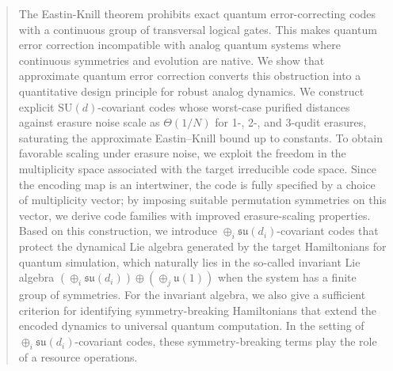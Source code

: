 \documentclass[twocolumn,superscriptaddress,aps,showpacs,amsmath,amstex,amssymb,citeautoscript,floatfix,pra,preprintnumbers]{revtex4-2}
\newcounter{alg}
\theoremstyle{plain}
\theoremstyle{plain}
\theoremstyle{plain}
\theoremstyle{plain}
\theoremstyle{plain}
\theoremstyle{plain}
\begin{document}
\begin{abstract}
The Eastin-Knill theorem prohibits exact quantum error-correcting codes with a continuous group of transversal logical gates. This makes quantum error correction incompatible with analog quantum systems where continuous symmetries and evolution are native. We show that approximate quantum error correction converts this obstruction into a quantitative design principle for robust analog dynamics. We construct explicit $\mathrm{SU}(d)$-covariant codes whose worst-case purified distances against erasure noise scale as $\Theta(1/N)$ for 1-, 2-, and 3-qudit erasures, saturating the approximate Eastin–Knill bound up to constants. To obtain favorable scaling under erasure noise, we exploit the freedom in the multiplicity space associated with the target irreducible code space. Since the encoding map is an intertwiner, the code is fully specified by a choice of multiplicity vector; by imposing suitable permutation symmetries on this vector, we derive code families with improved erasure-scaling properties. Based on this construction, we introduce $\oplus_i \mathfrak{su}(d_i)$-covariant codes that protect the dynamical Lie algebra generated by the target Hamiltonians for quantum simulation, which naturally lies in the so-called invariant Lie algebra $\left(\oplus_i \mathfrak{su}(d_i)\right)\oplus\left(\oplus_j\mathfrak{u}(1)\right)$ when the system has a finite group of symmetries. For the invariant algebra, we also give a sufficient criterion for identifying symmetry-breaking Hamiltonians that extend the encoded dynamics to universal quantum computation. In the setting of $\oplus_i \mathfrak{su}(d_i)$-covariant codes, these symmetry-breaking terms play the role of a resource operations.





\end{abstract}
\end{document}
